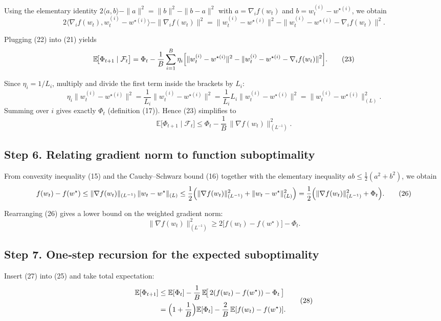 \documentclass[11pt]{article}
\begin{document}
Using the elementary identity
$2\langle a,b\rangle -\|a\|^{2}= \|b\|^{2}-\|b-a\|^{2}$ with
$a=\nabla_i f(w_t)$ and $b=w_t^{(i)}-w^{\star(i)}$, we obtain
\[
2\langle \nabla_i f(w_t), w_t^{(i)}-w^{\star(i)}\rangle
-\|\nabla_i f(w_t)\|^{2}
= \|w_t^{(i)}-w^{\star(i)}\|^{2}
  -\|w_t^{(i)}-w^{\star(i)}-\nabla_i f(w_t)\|^{2}.
\tag{22}
\]

Plugging (22) into (21) yields
\[
\mathbb{E}\!\bigl[\Phi_{t+1}\mid\mathcal{F}_t\bigr]
= \Phi_t-\frac{1}{B}\sum_{i=1}^{B}\eta_i
   \Bigl[\|w_t^{(i)}-w^{\star(i)}\|^{2}
        -\|w_t^{(i)}-w^{\star(i)}-\nabla_i f(w_t)\|^{2}\Bigr].
\tag{23}
\]

Since $\eta_i=1/L_i$, multiply and divide the first term inside the brackets
by $L_i$:
\[
\eta_i\|w_t^{(i)}-w^{\star(i)}\|^{2}
= \frac{1}{L_i}\|w_t^{(i)}-w^{\star(i)}\|^{2}
= \frac{1}{L_i}L_i\|w_t^{(i)}-w^{\star(i)}\|^{2}
= \|w_t^{(i)}-w^{\star(i)}\|_{(L)}^{2}.
\tag{24}
\]
Summing over $i$ gives exactly $\Phi_t$ (definition (17)). Hence (23) simplifies to
\[
\mathbb{E}\!\bigl[\Phi_{t+1}\mid\mathcal{F}_t\bigr]
\le \Phi_t-\frac{1}{B}\,\| \nabla f(w_t) \|_{(L^{-1})}^{2}.
\tag{25}
\]

\subsection*{Step 6. Relating gradient norm to function suboptimality}
From convexity inequality (15) and the Cauchy–Schwarz bound (16) together with
the elementary inequality $ab\le \frac{1}{2}(a^{2}+b^{2})$, we obtain
\[
f(w_t)-f(w^\star)
\le \|\nabla f(w_t)\|_{(L^{-1})}\,\|w_t-w^\star\|_{(L)}
\le \frac{1}{2}\Bigl(\|\nabla f(w_t)\|_{(L^{-1})}^{2}
      +\|w_t-w^\star\|_{(L)}^{2}\Bigr)
= \frac{1}{2}\Bigl(\|\nabla f(w_t)\|_{(L^{-1})}^{2}
      +\Phi_t\Bigr).
\tag{26}
\]

Rearranging (26) gives a lower bound on the weighted gradient norm:
\[
\|\nabla f(w_t)\|_{(L^{-1})}^{2}
\ge 2\bigl[f(w_t)-f(w^\star)\bigr]-\Phi_t .
\tag{27}
\]

\subsection*{Step 7. One‑step recursion for the expected suboptimality}
Insert (27) into (25) and take total expectation:
\[
\begin{aligned}
\mathbb{E}[\Phi_{t+1}]
&\le \mathbb{E}[\Phi_t]
   -\frac{1}{B}\,\mathbb{E}\!\bigl[\,2(f(w_t)-f(w^\star))-\Phi_t\,\bigr]\\
&= \Bigl(1+\frac{1}{B}\Bigr)\mathbb{E}[\Phi_t]
   -\frac{2}{B}\,\mathbb{E}[f(w_t)-f(w^\star)] .
\end{aligned}
\tag{28}
\]
\end{document}
